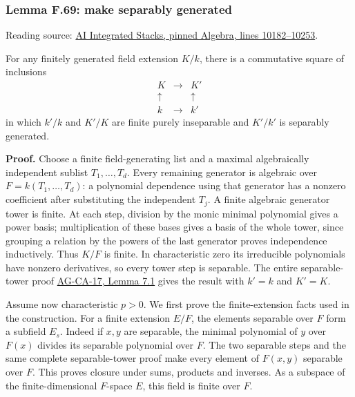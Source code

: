 \documentclass[11pt,a4paper,openany]{report}
\begin{document}
\label{AG-RG-S05-algebra-lemma-make-separably-generated}

\subsubsection{Lemma F.69: make separably generated}\label{AG-RG-S05-lemma-f.69-make-separably-generated}

Reading source: \href{https://github.com/KokunoYumeto/unofficial-stacks-project-ai-drafts/blob/565b10e987aba5969b21145a0833f42d69f96790/algebra.tex\#L10182-L10253}{AI Integrated Stacks, pinned Algebra, lines 10182--10253}.

For any finitely generated field extension \(K/k\), there is a commutative square of inclusions \[
\begin{array}{ccc}
K&\longrightarrow&K'\\
\uparrow&&\uparrow\\
k&\longrightarrow&k'
\end{array}
\] in which \(k'/k\) and \(K'/K\) are finite purely inseparable and \(K'/k'\) is separably generated.

\textbf{Proof.} Choose a finite field-generating list and a maximal algebraically independent sublist \(T_1,\ldots,T_d\). Every remaining generator is algebraic over \(F=k(T_1,\ldots,T_d)\): a polynomial dependence using that generator has a nonzero coefficient after substituting the independent \(T_j\). A finite algebraic generator tower is finite. At each step, division by the monic minimal polynomial gives a power basis; multiplication of these bases gives a basis of the whole tower, since grouping a relation by the powers of the last generator proves independence inductively. Thus \(K/F\) is finite. In characteristic zero its irreducible polynomials have nonzero derivatives, so every tower step is separable. The entire separable-tower proof \href{https://github.com/KokunoYumeto/open-math-courses/blob/d02d0a3669f42579db037cd44de1d113fdd770a1/docs/courses/AG-CA/src/formally-smooth-unramified-and-etale-ring-maps.md}{AG-CA-17, Lemma 7.1} gives the result with \(k'=k\) and \(K'=K\).

Assume now characteristic \(p>0\). We first prove the finite-extension facts used in the construction. For a finite extension \(E/F\), the elements separable over \(F\) form a subfield \(E_s\). Indeed if \(x,y\) are separable, the minimal polynomial of \(y\) over \(F(x)\) divides its separable polynomial over \(F\). The two separable steps and the same complete separable-tower proof make every element of \(F(x,y)\) separable over \(F\). This proves closure under sums, products and inverses. As a subspace of the finite-dimensional \(F\)-space \(E\), this field is finite over \(F\).
\end{document}

